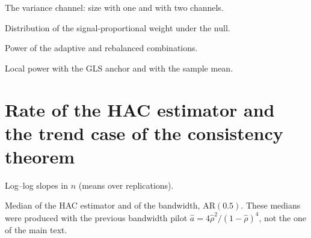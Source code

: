 \documentclass[11pt]{article}
\begin{document}
\begin{table}[htbp]
\centering
\caption{The variance channel: size with one and with two channels.}
\label{tab:negvariance}
\small
\begin{adjustbox}{max width=\textwidth}

\end{adjustbox}
\end{table}

\begin{table}[htbp]
\centering
\caption{Distribution of the signal-proportional weight under the null.}
\label{tab:negweight}
\small
\begin{adjustbox}{max width=\textwidth}

\end{adjustbox}
\end{table}

\begin{table}[htbp]
\centering
\caption{Power of the adaptive and rebalanced combinations.}
\label{tab:negrebal}
\small
\begin{adjustbox}{max width=\textwidth}

\end{adjustbox}
\end{table}

\begin{table}[htbp]
\centering
\caption{Local power with the GLS anchor and with the sample mean.}
\label{tab:neganchor}
\small
\begin{adjustbox}{max width=\textwidth}

\end{adjustbox}
\end{table}

\FloatBarrier
\section{Rate of the HAC estimator and the trend case of the consistency theorem}\label{supp:s7}

\begin{table}[htbp]
\centering
\caption{Log--log slopes in $n$ (means over replications).}
\label{tab:hacrates}
\small
\begin{adjustbox}{max width=\textwidth}

\end{adjustbox}
\end{table}

\begin{table}[htbp]
\centering
\caption{Median of the HAC estimator and of the bandwidth, AR$(0.5)$. These medians were produced with the previous bandwidth pilot $\hat a = 4\hat\rho^2/(1-\hat\rho)^4$, not the one of the main text.}
\label{tab:hacmedian}
\small
\begin{adjustbox}{max width=\textwidth}

\end{adjustbox}
\end{table}
\end{document}
